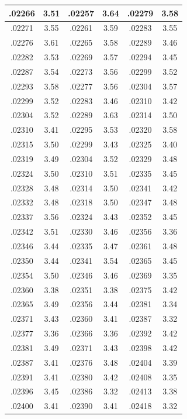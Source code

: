 \documentclass[10pt,twoside]{report}
\begin{document}
\begin{appendices}
\begin{longtable}{|c|c||c|c||c|c|}
.02266 & 3.51 & .02257 & 3.64 & .02279 & 3.58\\\hline
.02271 & 3.55 & .02261 & 3.59 & .02283 & 3.55\\\hline
.02276 & 3.61 & .02265 & 3.58 & .02289 & 3.46\\\hline
.02282 & 3.53 & .02269 & 3.57 & .02294 & 3.45\\\hline
.02287 & 3.54 & .02273 & 3.56 & .02299 & 3.52\\\hline
.02293 & 3.58 & .02277 & 3.56 & .02304 & 3.57\\\hline
.02299 & 3.52 & .02283 & 3.46 & .02310 & 3.42\\\hline
.02304 & 3.52 & .02289 & 3.63 & .02314 & 3.50\\\hline
.02310 & 3.41 & .02295 & 3.53 & .02320 & 3.58\\\hline
.02315 & 3.50 & .02299 & 3.43 & .02325 & 3.40\\\hline
.02319 & 3.49 & .02304 & 3.52 & .02329 & 3.48\\\hline
.02324 & 3.50 & .02310 & 3.51 & .02335 & 3.45\\\hline
.02328 & 3.48 & .02314 & 3.50 & .02341 & 3.42\\\hline
.02332 & 3.48 & .02318 & 3.50 & .02347 & 3.48\\\hline
.02337 & 3.56 & .02324 & 3.43 & .02352 & 3.45\\\hline
.02342 & 3.51 & .02330 & 3.46 & .02356 & 3.36\\\hline
.02346 & 3.44 & .02335 & 3.47 & .02361 & 3.48\\\hline
.02350 & 3.44 & .02341 & 3.54 & .02365 & 3.45\\\hline
.02354 & 3.50 & .02346 & 3.46 & .02369 & 3.35\\\hline
.02360 & 3.38 & .02351 & 3.38 & .02375 & 3.42\\\hline
.02365 & 3.49 & .02356 & 3.44 & .02381 & 3.34\\\hline
.02371 & 3.43 & .02360 & 3.41 & .02387 & 3.32\\\hline
.02377 & 3.36 & .02366 & 3.36 & .02392 & 3.42\\\hline
.02381 & 3.49 & .02371 & 3.43 & .02398 & 3.42\\\hline
.02387 & 3.41 & .02376 & 3.48 & .02404 & 3.39\\\hline
.02391 & 3.41 & .02380 & 3.42 & .02408 & 3.35\\\hline
.02396 & 3.45 & .02386 & 3.32 & .02413 & 3.38\\\hline
.02400 & 3.41 & .02390 & 3.41 & .02418 & 3.32\\\hline

\end{longtable}
\end{appendices}
\end{document}
